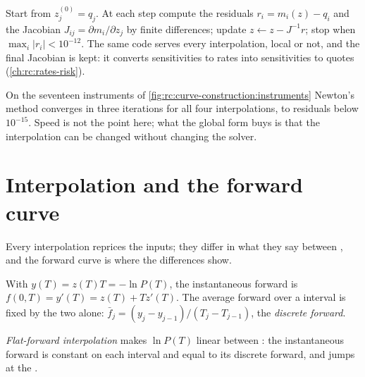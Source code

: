 \begin{method}\label{met:rc:curve-construction:newton}
Start from $z^{(0)}_j=q_j$. At each step compute the residuals $r_i = m_i(z)
- q_i$ and the Jacobian $J_{ij}=\partial m_i/\partial z_j$ by finite
differences; update $z \leftarrow z - J^{-1}r$; stop when $\max_i|r_i|<10^{-12}$.
The same code serves every interpolation, local or not, and the final Jacobian
is kept: it converts sensitivities to  rates into sensitivities to
quotes (\cref{ch:rc:rates-risk}).
\end{method}

\label{lst:rc:curve-construction:calibrate}

On the seventeen instruments of \cref{fig:rc:curve-construction:instruments}
Newton's method converges in three iterations for all four interpolations,
to residuals below $10^{-15}$. Speed is not the point here; what the global
form buys is that the interpolation can be changed without changing the solver.

\section{Interpolation and the forward curve}

Every interpolation reprices the inputs; they differ in what they say between
, and the forward curve is where the differences show.

\begin{proposition}\label{prop:rc:curve-construction:fwd}
With $y(T) = z(T)T = -\ln P(T)$, the instantaneous forward is $f(0,T) =
y'(T) = z(T) + T z'(T)$. The average forward over a  interval is fixed by
the two  alone: $\bar f_j = (y_j - y_{j-1})/(T_j-T_{j-1})$, the
\emph{discrete forward}.
\end{proposition}

\begin{definition}\label{def:rc:curve-construction:flatfwd}
\emph{Flat-forward interpolation} makes
$\ln P(T)$ linear between : the instantaneous forward is constant on
each interval and equal to its discrete forward, and jumps at the .
\end{definition}

